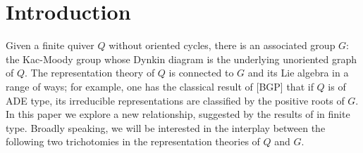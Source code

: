 \documentclass[12pt]{amsart}
\numberwithin{equation}{section}
\begin{document}
\begin{abstract}




\end{abstract}

\maketitle

\section{Introduction}

Given a finite quiver $Q$ without oriented cycles, there is an associated group $G$: the Kac-Moody group whose Dynkin diagram is the underlying unoriented graph of $Q$. The representation theory of $Q$ is connected to $G$ and its Lie algebra in a range of ways; for example, one has the classical result of [BGP] that if $Q$ is of ADE type, its irreducible representations are classified by the positive roots of $G$. In this paper we explore a new relationship, suggested by the results of \cite{YZ08} in finite type. Broadly speaking, we will be interested in the interplay between the following two trichotomies in the representation theories of $Q$ and $G$.
\end{document}
